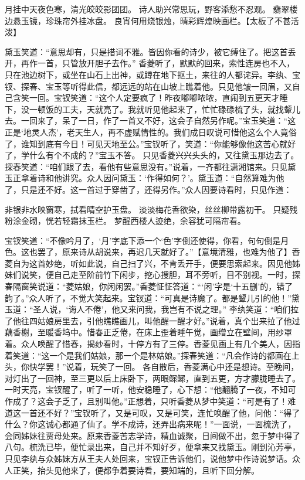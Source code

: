 \documentclass[12pt,oneside]{book}
\begin{document}
月挂中天夜色寒，清光皎皎影团团。
诗人助兴常思玩，野客添愁不忍观。
翡翠楼边悬玉镜，珍珠帘外挂冰盘。
良宵何用烧银烛，晴彩辉煌映画栏。【太板了不甚活泼】

黛玉笑道：“意思却有，只是措词不雅。皆因你看的诗少，被它缚住了。把这首丢开，再作一首，只管放开胆子去作。”
香菱听了，默默的回来，索性连房也不入，只在池边树下，或坐在山石上出神，或蹲在地下抠土，来往的人都诧异。李纨、宝钗、探春、宝玉等听得此信，都远远的站在山坡上瞧着他。只见他皱一回眉，又自己含笑一回。宝钗笑道：“这个人定要疯了！昨夜嘟嘟哝哝，直闹到五更天才睡下，没一顿饭的工夫，天就亮了。我就听见他起来了，忙忙碌碌梳了头，就找颦儿去。一回来了，呆了一日，作了一首又不好，这会子自然另作呢。”宝玉笑道：“这正是‘地灵人杰’，老天生人，再不虚赋情性的。我们成日叹说可惜他这么个人竟俗了，谁知到底有今日！可见天地至公。”宝钗听了，笑道：“你能够像他这苦心就好了，学什么有个不成的？”宝玉不答。
只见香菱兴兴头头的，又往黛玉那边去了。探春笑道：“咱们跟了去，看他有些意思没有。”说着，一齐都往潇湘馆来。只见黛玉正拿着诗和他讲究。众人因问黛玉：‘作得如何？’。黛玉道：“自然算难为他了，只是还不好。这一首过于穿凿了，还得另作。”众人因要诗看时，只见作道：

非银非水映窗寒，拭看晴空护玉盘。
淡淡梅花香欲染，丝丝柳带露初干。
只疑残粉涂金砌，恍若轻霜抹玉栏。
梦醒西楼人迹绝，余容犹可隔帘看。

宝钗笑道：“不像吟月了，‘月’字底下添一个‘色’字倒还使得，你看，句句倒是月色。这也罢了，原来诗从胡说来，再迟几天就好了。”【意境清雅，也难为他了】香菱自为这首妙绝，听如此说，自己扫了兴，不肯丢开手，便要思索起来。因见他姊妹们说笑，便自己走至阶前竹下闲步，挖心搜胆，耳不旁听，目不别视。一时，探春隔窗笑说道：“菱姑娘，你闲闲罢。”香菱怔怔答道：“‘闲’字是‘十五删’的，错了韵了。”众人听了，不觉大笑起来。宝钗道：“可真是诗魔了。都是颦儿引的他！”黛玉道：“圣人说，‘诲人不倦’，他又来问我，我岂有不说之理。”
李纨笑道：“咱们拉了他往四姑娘房里去，引他瞧瞧画儿，叫他醒一醒才好。”说着，真个出来拉了他过藕香榭，至暖香坞中。惜春正乏倦，在床上歪着睡午觉，画缯立在壁间，用纱罩着。众人唤醒了惜春，揭纱看时，十停方有了三停。香菱见画上有几个美人，因指着笑道：“这一个是我们姑娘，那一个是林姑娘。”探春笑道：“凡会作诗的都画在上头，你快学罢！”说着，玩笑了一回。
各自散后，香菱满心中还是想诗。至晚间，对灯出了一回神，至三更以后上床卧下，两眼鳏鳏，直到五更，方才朦胧睡去了。一时天亮，宝钗醒了，听了一听，他安稳睡了，心下想：“他翻腾了一夜，不知可作成了？这会子乏了，且别叫他。”正想着，只听香菱从梦中笑道：“可是有了！难道这一首还不好？”宝钗听了，又是可叹，又是可笑，连忙唤醒了他，问他：“得了什么？你这诚心都通了仙了。学不成诗，还弄出病来呢！”一面说，一面梳洗了，会同姊妹往贾母处来。原来香菱苦志学诗，精血诚聚，日间做不出，忽于梦中得了八句。梳洗已毕，便忙录出来，自己并不知好歹，便拿来又找黛玉。刚到沁芳亭，只见李纨与众姊妹方从王夫人处回来，宝钗正告诉他们，说他梦中作诗说梦话。众人正笑，抬头见他来了，便都争着要诗看，要知端的，且听下回分解。
 
\end{document}
